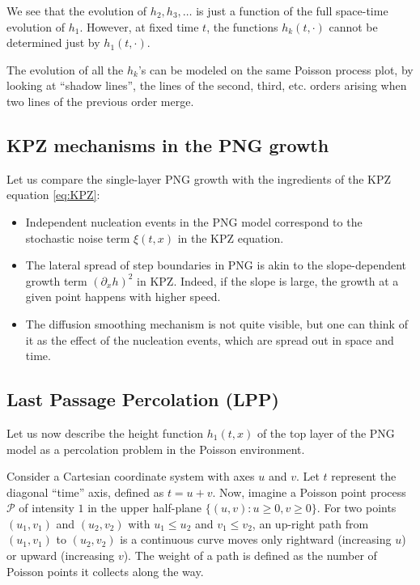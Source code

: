 \documentclass[letterpaper,11pt,oneside,reqno]{article}
\numberwithin{equation}{section}
\theoremstyle{definition}
\begin{document}
We see that the evolution of $h_2,h_3,\ldots $ is
just a function of the full space-time evolution of $h_1$.
However, at fixed time $t$,
the functions $h_k(t,\cdot)$ cannot be determined
just by $h_1(t,\cdot)$.

The evolution of all the $h_k$'s can be modeled on the same Poisson process plot,
by looking at ``shadow lines'', the lines of the second, third, etc. orders
arising when two lines of the previous order merge.

\subsection{KPZ mechanisms in the PNG growth}

Let us compare the single-layer PNG growth with the ingredients of the KPZ equation
\eqref{eq:KPZ}:
\begin{itemize}
	\item Independent nucleation events in the PNG model correspond to the stochastic noise term $\xi(t,x)$ in the KPZ equation.
	\item The lateral spread of step boundaries in PNG is akin to the slope-dependent growth term $(\partial_x h)^2$ in KPZ. Indeed, if the slope is large, the growth at a given point happens with higher speed.
	\item
		The diffusion smoothing mechanism is not quite visible, but one can think of it as the effect of the nucleation events, which are spread out in space and time.
\end{itemize}

\subsection{Last Passage Percolation (LPP)}

Let us now describe the height function $h_1(t,x)$ of the top layer of the PNG model as a
percolation problem in the Poisson environment.

Consider a Cartesian coordinate system with axes $u$ and
$v$. Let $t$
represent the diagonal ``time'' axis, defined as $t = u + v$.
Now, imagine a Poisson point process $\mathcal{P}$ of
intensity $1$ in the upper half-plane $\{(u,v): u\ge 0, v\ge 0\}$.
For two points $(u_1, v_1)$ and $(u_2, v_2)$ with $u_1 \leq
u_2$ and $v_1 \leq v_2$, an up-right path from $(u_1, v_1)$
to $(u_2, v_2)$ is a continuous curve moves only
rightward (increasing $u$) or upward (increasing $v$). The
weight of a path is defined as the number of Poisson points
it collects along the way.
\end{document}

